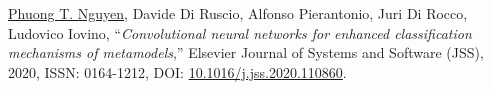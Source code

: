 \documentclass[a4paper,9pt]{article} %
\begin{document}
\begin{thebibliography}{100}
%	
%	
	\underline{Phuong T. Nguyen}, Davide Di Ruscio, Alfonso Pierantonio, Juri Di Rocco, Ludovico Iovino, ``\emph{Convolutional neural networks for enhanced classification mechanisms of metamodels},'' Elsevier Journal of Systems and Software (JSS), 2020, ISSN: 0164-1212, DOI: \href{https://doi.org/10.1016/j.jss.2020.110860}{10.1016/j.jss.2020.110860}.		
	
	



\end{thebibliography}
\end{document}
